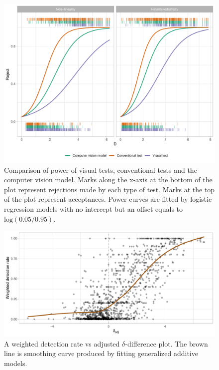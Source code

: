 \documentclass[]{interact}
\theoremstyle{plain}%
\theoremstyle{definition}
\theoremstyle{remark}
\begin{document}
\begin{figure}[!h]

{\centering \includegraphics[width=1\linewidth]{paper_files/figure-latex/power-1} 

}

\caption{Comparison of power of visual tests, conventional tests and the computer vision model. Marks along the x-axis at the bottom of the plot represent rejections made by each type of test. Marks at the top of the plot represent acceptances. Power curves are fitted by logistic regression models with no intercept but an offset equals to $\text{log}(0.05/0.95)$.}\label{fig:power}
\end{figure}

\begin{figure}[!h]

{\centering \includegraphics[width=0.8\linewidth]{paper_files/figure-latex/delta-1} 

}

\caption{A weighted detection rate vs adjusted $\delta$-difference plot. The brown line is smoothing curve produced by fitting generalized additive models.}\label{fig:delta}
\end{figure}
\end{document}
